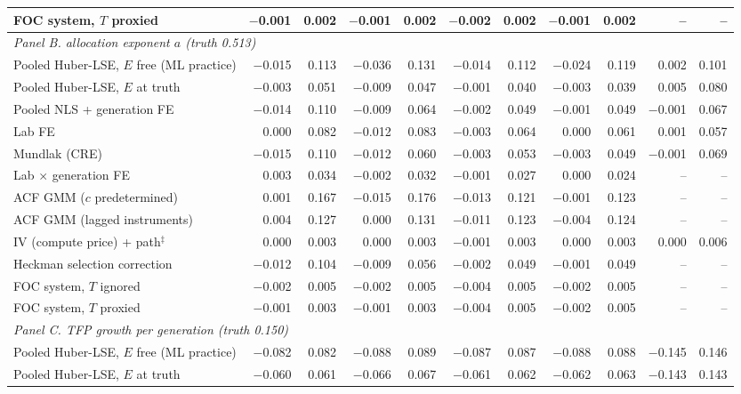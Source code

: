 \begin{table}[!htbp]
\begin{threeparttable}
\begin{tabular}{lrrrrrrrrrr}
FOC system, $T$ proxied & $-$0.001 & 0.002 & $-$0.001 & 0.002 & $-$0.002 & 0.002 & $-$0.001 & 0.002 & -- & -- \\
\midrule
\multicolumn{11}{l}{\textit{Panel B. allocation exponent $a$ (truth 0.513)}} \\
Pooled Huber-LSE, $E$ free (ML practice) & $-$0.015 & 0.113 & $-$0.036 & 0.131 & $-$0.014 & 0.112 & $-$0.024 & 0.119 & 0.002 & 0.101 \\
Pooled Huber-LSE, $E$ at truth & $-$0.003 & 0.051 & $-$0.009 & 0.047 & $-$0.001 & 0.040 & $-$0.003 & 0.039 & 0.005 & 0.080 \\
Pooled NLS + generation FE & $-$0.014 & 0.110 & $-$0.009 & 0.064 & $-$0.002 & 0.049 & $-$0.001 & 0.049 & $-$0.001 & 0.067 \\
Lab FE & 0.000 & 0.082 & $-$0.012 & 0.083 & $-$0.003 & 0.064 & 0.000 & 0.061 & 0.001 & 0.057 \\
Mundlak (CRE) & $-$0.015 & 0.110 & $-$0.012 & 0.060 & $-$0.003 & 0.053 & $-$0.003 & 0.049 & $-$0.001 & 0.069 \\
Lab $\times$ generation FE & 0.003 & 0.034 & $-$0.002 & 0.032 & $-$0.001 & 0.027 & 0.000 & 0.024 & -- & -- \\
ACF GMM ($c$ predetermined) & 0.001 & 0.167 & $-$0.015 & 0.176 & $-$0.013 & 0.121 & $-$0.001 & 0.123 & -- & -- \\
ACF GMM (lagged instruments) & 0.004 & 0.127 & 0.000 & 0.131 & $-$0.011 & 0.123 & $-$0.004 & 0.124 & -- & -- \\
IV (compute price) + path$^{\ddagger}$ & 0.000 & 0.003 & 0.000 & 0.003 & $-$0.001 & 0.003 & 0.000 & 0.003 & 0.000 & 0.006 \\
Heckman selection correction & $-$0.012 & 0.104 & $-$0.009 & 0.056 & $-$0.002 & 0.049 & $-$0.001 & 0.049 & -- & -- \\
FOC system, $T$ ignored & $-$0.002 & 0.005 & $-$0.002 & 0.005 & $-$0.004 & 0.005 & $-$0.002 & 0.005 & -- & -- \\
FOC system, $T$ proxied & $-$0.001 & 0.003 & $-$0.001 & 0.003 & $-$0.004 & 0.005 & $-$0.002 & 0.005 & -- & -- \\
\midrule
\multicolumn{11}{l}{\textit{Panel C. TFP growth per generation (truth 0.150)}} \\
Pooled Huber-LSE, $E$ free (ML practice) & $-$0.082 & 0.082 & $-$0.088 & 0.089 & $-$0.087 & 0.087 & $-$0.088 & 0.088 & $-$0.145 & 0.146 \\
Pooled Huber-LSE, $E$ at truth & $-$0.060 & 0.061 & $-$0.066 & 0.067 & $-$0.061 & 0.062 & $-$0.062 & 0.063 & $-$0.143 & 0.143 \\

\end{tabular}
\end{threeparttable}
\end{table}
